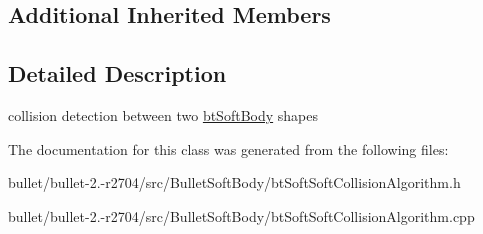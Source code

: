 \subsection*{Additional Inherited Members}


\subsection{Detailed Description}
collision detection between two \hyperlink{classbt_soft_body}{bt\+Soft\+Body} shapes 

The documentation for this class was generated from the following files\+:\begin{DoxyCompactItemize}
\item 
bullet/bullet-\/2.-\/r2704/src/\+Bullet\+Soft\+Body/bt\+Soft\+Soft\+Collision\+Algorithm.\+h\item 
bullet/bullet-\/2.-\/r2704/src/\+Bullet\+Soft\+Body/bt\+Soft\+Soft\+Collision\+Algorithm.\+cpp\end{DoxyCompactItemize}

